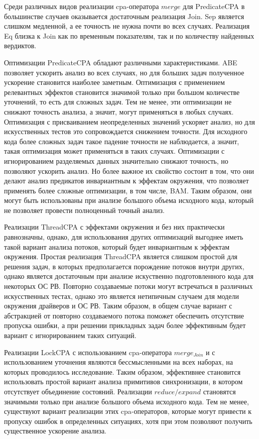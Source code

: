 Среди различных видов реализации cpa-оператора $merge$ для PredicateCPA в большинстве случаев оказывается достаточным реализация Join. 
Sep является слишком медленной, а ее точность не нужна почти во всех случаях. Реализация Eq близка к Join как по временным показателям, так и по количеству найденных вердиктов.

Оптимизации PredicateCPA обладают различными характеристиками. ABE позволяет ускорить анализ во всех случаях, но для больших задач полученное ускорение становится наиболее заметным. 
Оптимизация с применением релевантных эффектов становится значимой только при большом количестве уточнений, то есть для сложных задач.
Тем не менее, эти оптимизации не снижают точность анализа, а значит, могут применяться в любых случаях.
Оптимизация с присваиванием неопределенных значений ускоряет анализ, но для искусственных тестов это сопровождается снижением точности.
Для исходного кода более сложных задач такое падение точности не наблюдается, а значит, такая оптимизация может применяться в таких случаях.
Оптимизации с игнорированием разделяемых данных значительно снижают точность, но позволяют ускорить анализ.
Но более важное их свойство состоит в том, что они делают анализ предикатов инвариантным к эффектам окружения, что позволяет применять более сложные оптимизации, в том числе, BAM.
Таким образом, они могут быть использованы при анализе большого объема исходного кода, который не позволяет провести полноценный точный анализ.

Реализации ThreadCPA с эффектами окружения и без них практически равнозначны, однако, для использования других оптимизаций выгоднее иметь такой вариант анализа потоков, который будет инвариантным к эффектам окружения.
Простая реализация ThreadCPA является слишком простой для решения задач, в которых предполагается порождение потоков внутри других, однако является достаточным при анализе искуственно подготовленного кода для некоторых ОС РВ.
Повторно создаваемые потоки могут встречаться в различных искусственных тестах, однако это является нетипичным случаем для модели окружения драйверов и ОС РВ.
Таким образом, в общем случае вариант с абстракцией от повторно создаваемого потока поможет обеспечить отсутствие пропуска ошибки, а при решении прикладных задач более эффективным будет вариант с игнорированием таких ситуаций.

Реализации LockCPA с использованием cpa-оператора $merge_{Join}$ и с использованием уточнения являются бессмысленными на всех наборах, на которых проводилось исследование. 
Таким образом, эффективнее становится использовать простой вариант анализа примитивов синхронизации, в котором отсутствует объединение состояний.
Реализации $reduce/expand$ становятся значимыми только при анализе большого объема исходного кода.
Тем не менее, существуют вариант реализации этих cpa-операторов, которые могут привести к пропуску ошибок в определенных ситуациях, хотя при этом позволяют получить существенное ускорение анализа.

